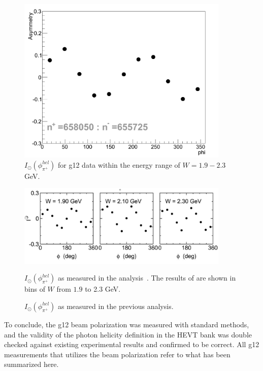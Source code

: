 \begin{figure}[h]
\begin{center}
 \includegraphics[width=0.9\textwidth]{figures/calib/pol/myIo.png}
  \caption{$I_{\odot}(\phi^{hel}_{\pi^+})$ for g12 data within the energy range of $W = 1.9-2.3$ GeV.}
  \label{myIo}
  \end{center}
\end{figure}


\begin{figure}[h]
\begin{center}
 \includegraphics[width=0.9\textwidth]{figures/calib/pol/Io.png}
  \caption{$I_{\odot}(\phi^{hel}_{\pi^+})$ as measured in the previous analysis.}{ $I_{\odot}(\phi^{hel}_{\pi^+})$ as measured in the analysis~\cite{Io}. The results of are shown in bins of $W$ from $1.9$ to 2.3 GeV.}
  \label{Io}
  \end{center}
\end{figure}




To conclude, the g12 beam polarization was measured with standard methods, and the validity of the photon helicity definition in the HEVT bank was double checked against existing experimental results and confirmed to be correct. All g12 measurements that utilizes the beam polarization refer to what has been summarized here.


